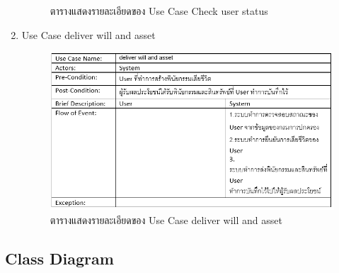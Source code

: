 \documentclass[12pt,oneside,openright,a4paper]{cpe-thai-project}
\begin{document}
\begin{enumerate}[label=\thesubsection.\arabic*,leftmargin=0pt,itemindent=2.5cm]
\begin{figure}[!thb]
		\caption{ตารางแสดงรายละเอียดของ Use Case Check user status}
	\end{figure}
	\FloatBarrier
\item Use Case deliver will and asset
	\begin{figure}[!thb]
		\centering
		\includegraphics[scale=0.8]{deliverWillAndAsset}
		\caption{ตารางแสดงรายละเอียดของ Use Case deliver will and asset}
	\end{figure}
	\FloatBarrier
\end{enumerate}
\subsection{Class Diagram}
\end{document}
